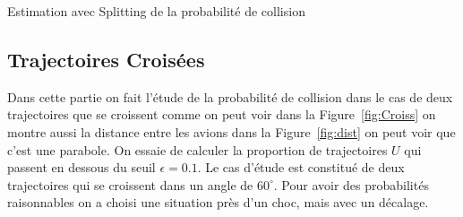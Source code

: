 \documentclass[a4paper, 12pt,twoside]{article}
\numberwithin{equation}{subsection}
\begin{document}
	\begin{table}[htbp]
		\begin{center}
		\end{center}
		\caption{Estimation avec Splitting de la probabilité de collision}
		\label{tab:Splitting}
	\end{table}
	
    
	\subsection{Trajectoires Croisées} %
	\label{sub:trajectoires_croisees}
	
	Dans cette partie on fait l'étude de la probabilité de collision dans le cas de deux trajectoires que se croissent comme on peut voir dans la Figure~\ref{fig:Croiss} on montre aussi la distance entre les avions dans la Figure~\ref{fig:dist} on peut voir que c'est une parabole. On essaie de calculer la proportion de trajectoires $U$ qui passent en dessous du seuil $\epsilon=0.1$. Le cas d'étude est constitué de deux trajectoires qui se croissent dans un angle de $60^{\circ}$. Pour avoir des probabilités raisonnables on a choisi une situation près d'un choc, mais avec un décalage.
	
\end{document}

